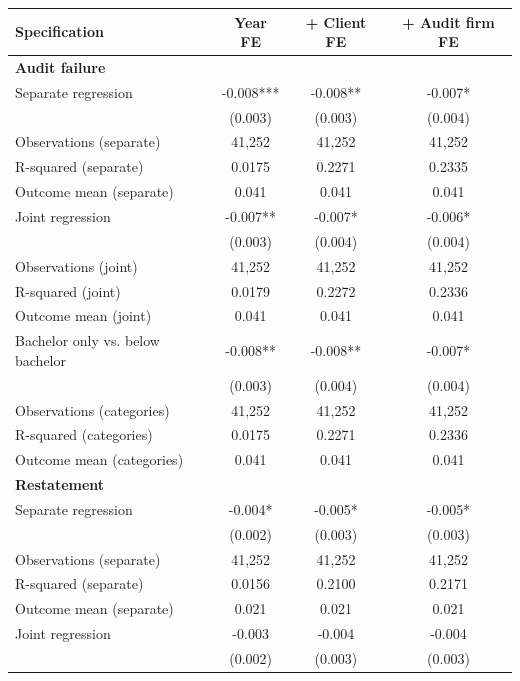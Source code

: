 \documentclass[10pt]{article}
\begin{document}
\begin{minipage}{19cm}\fontsize{10}{12}\selectfont\setlength{\tabcolsep}{4pt}\renewcommand{\arraystretch}{1.12}


\centering
{}
\begin{threeparttable}
\begin{tabular}{p{}ccc}
\toprule
Specification & Year FE & + Client FE & + Audit firm FE \\
\midrule
\multicolumn{4}{l}{\textbf{Audit failure}} \\
Separate regression & -0.008*** & -0.008** & -0.007* \\
 & (0.003) & (0.003) & (0.004) \\
Observations (separate) & 41,252 & 41,252 & 41,252 \\
R-squared (separate) & 0.0175 & 0.2271 & 0.2335 \\
Outcome mean (separate) & 0.041 & 0.041 & 0.041 \\
Joint regression & -0.007** & -0.007* & -0.006* \\
 & (0.003) & (0.004) & (0.004) \\
Observations (joint) & 41,252 & 41,252 & 41,252 \\
R-squared (joint) & 0.0179 & 0.2272 & 0.2336 \\
Outcome mean (joint) & 0.041 & 0.041 & 0.041 \\
Bachelor only vs. below bachelor & -0.008** & -0.008** & -0.007* \\
 & (0.003) & (0.004) & (0.004) \\
Observations (categories) & 41,252 & 41,252 & 41,252 \\
R-squared (categories) & 0.0175 & 0.2271 & 0.2336 \\
Outcome mean (categories) & 0.041 & 0.041 & 0.041 \\
\multicolumn{4}{l}{\textbf{Restatement}} \\
Separate regression & -0.004* & -0.005* & -0.005* \\
 & (0.002) & (0.003) & (0.003) \\
Observations (separate) & 41,252 & 41,252 & 41,252 \\
R-squared (separate) & 0.0156 & 0.2100 & 0.2171 \\
Outcome mean (separate) & 0.021 & 0.021 & 0.021 \\
Joint regression & -0.003 & -0.004 & -0.004 \\
 & (0.002) & (0.003) & (0.003) \\

\end{tabular}
\end{threeparttable}
\end{minipage}
\end{document}
